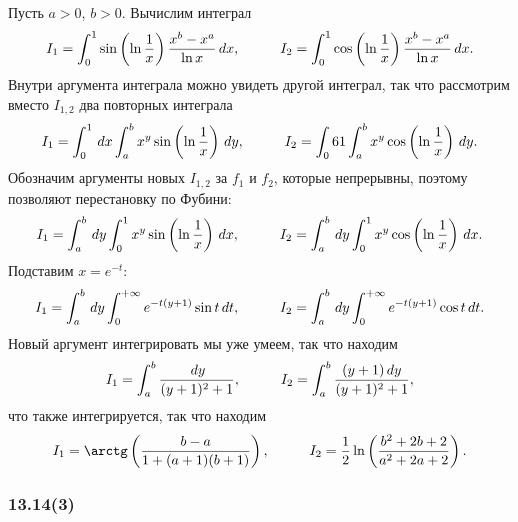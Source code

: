 Пусть $a > 0$, $b > 0$. Вычислим интеграл
\begin{equation*}
    I_1 = \int_0^1 \sin \left(
        \ln \frac{1}{x}
    \right) \frac{x^b - x^a}{\ln x} \d x,
    \hspace{10 mm}
    I_2 = \int_0^1 \cos\left(
        \ln \frac{1}{x}
    \right) \frac{x^b - x^a}{\ln x} \d x.
\end{equation*}
 Внутри аргумента интеграла можно увидеть другой интеграл, так что рассмотрим вместо $I_{1, 2}$ два повторных интеграла
 \begin{equation*}
     I_1 = \int_0^1 \d x \int_a^b x^y \sin\left(\ln \frac{1}{x}\right) \d y,
     \hspace{10 mm} 
     I_2 = \int_061 \int_{a}^{b} x^y \cos\left(\ln \frac{1}{x}\right) \d y.
 \end{equation*}
 Обозначим аргументы новых $I_{1, 2}$ за $f_1$ и $f_2$, которые непрерывны, поэтому позволяют перестановку по Фубини:
 \begin{equation*}
     I_1 = \int_{a}^{b} \d y \int_0^1 x^y \sin \left(\ln \frac{1}{x}\right) \d x,
     \hspace{10 mm}
     I_2 = \int_{a}^{b} \d y \int_0^1 x^y \cos \left(\ln \frac{1}{x}\right) \d x.
 \end{equation*}
 Подставим $x = e^{-t}$:
 \begin{equation*}
     I_1 = \int_{a}^{b}  \d y \int_0^{+\infty} e^{-t (y+1)} \sin t \d t, \hspace{10 mm}
     I_2 =\int_{a}^{b}  \d y \int_{0}^{+\infty} e^{-t (y+1)} \cos t \d t.
 \end{equation*}
 Новый аргумент интегрировать мы уже умеем, так что находим
 \begin{equation*}
     I_1 = \int_{a}^{b} \frac{\d y}{(y+1)^2 + 1},
     \hspace{10 mm}
     I_2 = \int_{a}^{b} \frac{(y+1)\d y}{(y+1)^2  + 1},
 \end{equation*}
 что также интегрируется, так что находим
 \begin{equation*}
     I_1 = \arctg \left(
        \frac{b-a}{1 + (a+1)(b+1)}
     \right),
     \hspace{10 mm}
     I_2 = \frac{1}{2} \ln \left(
        \frac{b^2 + 2 b + 2}{a^2 + 2 a + 2}
     \right).
 \end{equation*}





\subsubsection*{13.14(3)}

